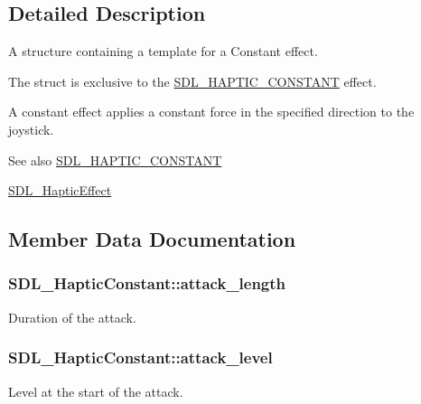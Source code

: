 \subsection{Detailed Description}
A structure containing a template for a Constant effect. 

The struct is exclusive to the \hyperlink{_s_d_l__haptic_8h_a955fb9f680dcf9cc72a3d5263e85b80a}{S\+D\+L\+\_\+\+H\+A\+P\+T\+I\+C\+\_\+\+C\+O\+N\+S\+T\+A\+N\+T} effect.

A constant effect applies a constant force in the specified direction to the joystick.

\begin{DoxySeeAlso}{See also}
\hyperlink{_s_d_l__haptic_8h_a955fb9f680dcf9cc72a3d5263e85b80a}{S\+D\+L\+\_\+\+H\+A\+P\+T\+I\+C\+\_\+\+C\+O\+N\+S\+T\+A\+N\+T} 

\hyperlink{union_s_d_l___haptic_effect}{S\+D\+L\+\_\+\+Haptic\+Effect} 
\end{DoxySeeAlso}


\subsection{Member Data Documentation}
\hypertarget{struct_s_d_l___haptic_constant_a907bade68ab53fb24e7d2651d19b767f}{}
\subsubsection[{attack\+\_\+length}]{ S\+D\+L\+\_\+\+Haptic\+Constant\+::attack\+\_\+length}\label{struct_s_d_l___haptic_constant_a907bade68ab53fb24e7d2651d19b767f}
Duration of the attack. \hypertarget{struct_s_d_l___haptic_constant_a0928a37f3fab0e5b7daffc7a1d65744c}{}
\subsubsection[{attack\+\_\+level}]{ S\+D\+L\+\_\+\+Haptic\+Constant\+::attack\+\_\+level}\label{struct_s_d_l___haptic_constant_a0928a37f3fab0e5b7daffc7a1d65744c}
Level at the start of the attack. \hypertarget{struct_s_d_l___haptic_constant_aa65321f1b002adaab6e629d5bed556e9}{}
